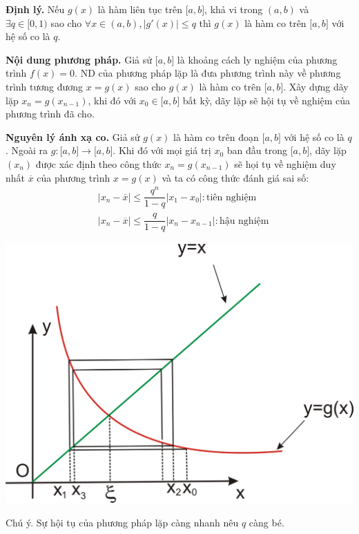 \documentclass[12pt, a4paper]{report}
\begin{document}
\textbf{Định lý.} Nếu $g(x)$ là hàm liên tục trên $\lbrack a,b \rbrack$, khả vi trong $(a,b)$ và $\exists q \in \lbrack0,1)$ sao cho $\forall x \in (a,b), |g'(x)|\leq q$ thì $g(x)$ là hàm co trên $\lbrack a,b \rbrack$ với hệ số co là $q$.

\textbf{Nội dung phương pháp.} Giả sử $\lbrack a,b \rbrack$ là khoảng cách ly nghiệm của phương trình $f(x)=0$. ND của phương pháp lặp là đưa phương trình này về phương trình tương đương $x=g(x)$ sao cho $g(x)$ là hàm co trên $\lbrack a,b \rbrack$. Xây dựng dãy lặp $x_n = g(x_{n-1})$, khi đó với $x_0 \in \lbrack a,b \rbrack$ bất kỳ, dãy lặp sẽ hội tụ về nghiệm của phương trình đã cho.

\textbf{Nguyên lý ánh xạ co.} Giả sử $g(x)$ là hàm co trên đoạn $\lbrack a,b \rbrack$ với hệ số co là $q$. Ngoài ra $g: \lbrack a,b \rbrack \to \lbrack a,b \rbrack$. Khi đó với mọi giá trị $x_0$ ban đầu trong $\lbrack a,b \rbrack$, dãy lặp $(x_n)$ được xác định theo công thức $x_n = g(x_{n-1})$ sẽ họi tụ về nghiệm duy nhất $\overline{x}$ của phương trình $x=g(x)$ và ta có công thức đánh giá sai số:
\[
    \begin{aligned}
        &|x_n - \overline{x}| \leq \dfrac{q^n}{1-q}|x_1 - x_0|: \text{tiên nghiệm}\\
        &|x_n - \overline{x}| \leq \dfrac{q}{1-q}|x_n - x_{n-1}|: \text{hậu nghiệm}
    \end{aligned}    
\]
\begin{center}
    \includegraphics[scale = 0.38]{3.png}
\end{center}
Chú ý. Sự hội tụ của phương pháp lặp càng nhanh nêu $q$ càng bé.
\end{document}
